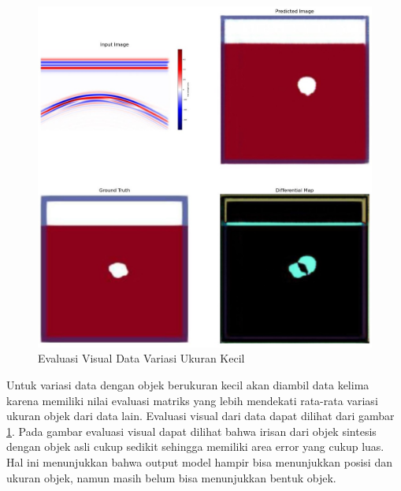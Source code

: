 \documentclass[conference]{IEEEtran}
\begin{document}
\begin{figure}[ht]
  \centering
  \includegraphics[scale=0.15]{gambar/diffMapKecil.jpg}
  \caption{Evaluasi Visual Data Variasi Ukuran Kecil}
  \label{fig:diffmapkecil}
\end{figure}

Untuk variasi data dengan objek berukuran kecil akan diambil data kelima karena memiliki nilai evaluasi matriks yang lebih mendekati rata-rata variasi ukuran objek dari data lain. 
Evaluasi visual dari data dapat dilihat dari gambar \ref{fig:diffmapkecil}. 
Pada gambar evaluasi visual dapat dilihat bahwa irisan dari objek sintesis dengan objek asli cukup sedikit sehingga memiliki area error yang cukup luas. 
Hal ini menunjukkan bahwa output model hampir bisa menunjukkan posisi dan ukuran objek, namun masih belum bisa menunjukkan bentuk objek.
\end{document}
